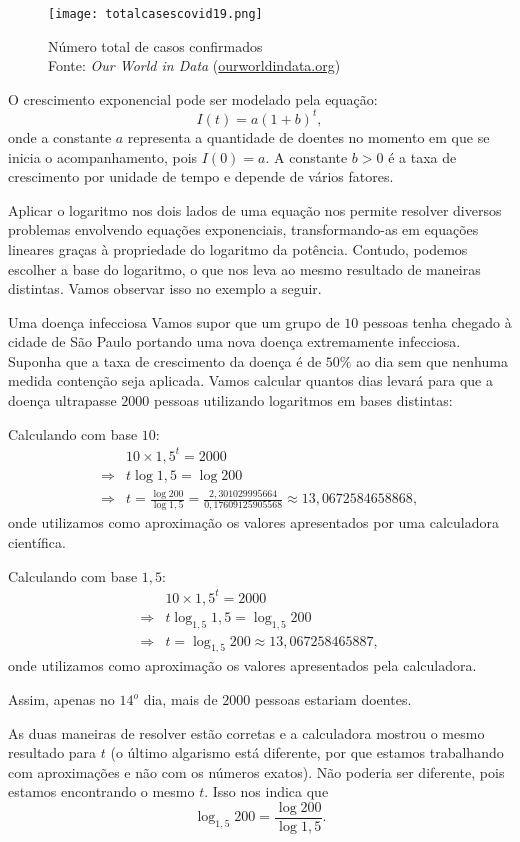 \begin{figure}[H]
\centering
\texttt{[image: totalcasescovid19.png]}

\caption{Número total de casos confirmados \\ Fonte: \textit{Our World in Data} (\url{ourworldindata.org})}
\end{figure}

O crescimento exponencial pode ser modelado pela equação:
$$
I(t) = a (1+b)^t,
$$
onde a constante $a$ representa a quantidade de doentes no momento em que se inicia o acompanhamento, pois $I(0) = a$. A constante $b>0$ é a taxa de crescimento por unidade de tempo e depende de vários fatores.

Aplicar o logaritmo nos dois lados de uma equação nos permite resolver diversos problemas envolvendo equações exponenciais, transformando-as em equações lineares graças à propriedade do logaritmo da potência. Contudo, podemos escolher a base do logaritmo, o que nos leva ao mesmo resultado de maneiras distintas. Vamos observar isso no exemplo a seguir.

\begin{example}{Uma doença infecciosa}
Vamos supor que um grupo de $10$ pessoas tenha chegado à cidade de São Paulo portando uma nova doença extremamente infecciosa. Suponha que a taxa de crescimento da doença é de $50\%$ ao dia sem que nenhuma medida contenção seja aplicada. Vamos calcular quantos dias levará para que a doença ultrapasse $2000$ pessoas utilizando logaritmos em bases distintas:

Calculando com base $10$:
\begin{align*} &10 \times 1{,}5^t = 2000\\
\Longrightarrow& t\log 1{,}5 = \log 200\\
\Longrightarrow& t = \frac{\log 200}{\log 1{,}5} = \frac{2{,}301029995664}{0{,}17609125905568} \approx 13{,}0672584658868,
\end{align*}
onde utilizamos como aproximação os valores apresentados por uma calculadora científica.

Calculando com base $1,5$:
\begin{align*} &10 \times 1{,}5^t = 2000\\
\Longrightarrow& t\log_{1{,}5} 1{,}5 = \log_{1{,}5} 200\\
\Longrightarrow& t = \log_{1{,}5} 200 \approx 13{,}067258465887,
\end{align*}
onde utilizamos como aproximação os valores apresentados pela calculadora.

Assim, apenas no $14^o$ dia, mais de $2000$ pessoas estariam doentes. 

As duas maneiras de resolver estão corretas e a calculadora mostrou o mesmo resultado para $t$ (o último algarismo está diferente, por que estamos trabalhando com aproximações e não com os números exatos). Não poderia ser diferente, pois estamos encontrando o mesmo $t$. Isso nos indica que
$$
\log_{1{,}5} 200 = \frac{\log 200}{\log 1{,}5}.
$$
\end{example}




